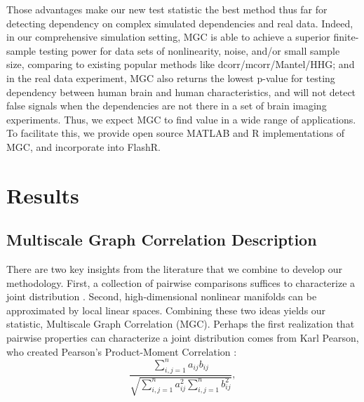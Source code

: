 \documentclass[11pt]{article}
\begin{document}
Those advantages make our new test statistic the best method thus far for detecting dependency on complex simulated dependencies and real data. Indeed, in our comprehensive simulation setting, MGC is able to achieve a superior finite-sample testing power for data sets of nonlinearity, noise, and/or small sample size, comparing to existing popular methods like dcorr/mcorr/Mantel/HHG; and in the real data experiment, MGC also returns the lowest p-value for testing dependency between human brain and human characteristics,  and will not detect false signals when the dependencies are not there in a set of brain imaging experiments. Thus, we expect MGC to find value in a wide range of applications.  To facilitate this, we provide open source MATLAB and R implementations of MGC, and incorporate into FlashR.


\section{Results}

\subsection{Multiscale Graph Correlation Description}

There are two key insights from the literature that we combine to develop our methodology.  First, a collection of pairwise comparisons  suffices to characterize a joint distribution \cite{Maa1996}.  Second, high-dimensional nonlinear manifolds can be approximated by local linear spaces.  Combining these two ideas yields our statistic,  Multiscale Graph Correlation (MGC).  Perhaps the first realization that pairwise properties can characterize a joint distribution comes from  Karl Pearson, who created Pearson's Product-Moment Correlation \cite{Pearson1895}:
\begin{equation}
\label{generalCoef}
\frac{\sum_{i,j=1}^n a_{ij} b_{ij}}{\sqrt{\sum_{i,j=1}^n  a_{ij}^{2} \sum_{i,j=1}^n b_{ij}^{2}}}, 
\end{equation}
\end{document}
